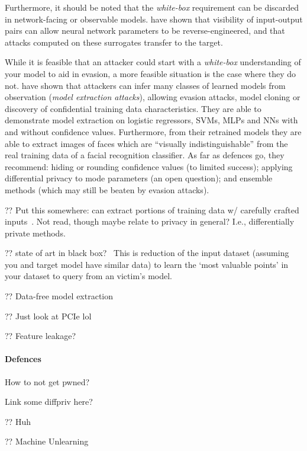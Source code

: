 Furthermore, it should be noted that the \emph{white-box} requirement can be discarded in network-facing or observable models.
\textcite{DBLP:conf/uss/TramerZJRR16,DBLP:conf/uss/JagielskiCBKP20} have shown that visibility of input-output pairs can allow neural network parameters to be reverse-engineered, and that attacks computed on these surrogates transfer to the target.

While it is feasible that an attacker could start with a \emph{white-box} understanding of your model to aid in evasion, a more feasible situation is the case where they do not.
\textcite{DBLP:conf/uss/TramerZJRR16} have shown that attackers can infer many classes of learned models from observation (\emph{model extraction attacks}), allowing evasion attacks, model cloning or discovery of confidential training data characteristics.
They are able to demonstrate model extraction on logistic regressors, SVMs, MLPs and NNs with and without confidence values.
Furthermore, from their retrained models they are able to extract images of faces which are ``visually indistinguishable'' from the real training data of a facial recognition classifier.
As far as defences go, they recommend: hiding or rounding confidence values (to limited success); applying differential privacy to mode parameters (an open question); and ensemble methods (which may still be beaten by evasion attacks).

?? Put this somewhere: can extract portions of training data w/ carefully crafted inputs~\parencite{DBLP:journals/corr/abs-2012-07805}. Not read, though maybe relate to privacy in general? I.e., differentially private methods.

?? state of art in black box?~\parencite{DBLP:conf/uss/HeM0HH21}
This is reduction of the input dataset (assuming you and target model have similar data) to learn the `most valuable points' in your dataset to query from an victim's model.

?? Data-free model extraction~\parencite{DBLP:conf/cvpr/TruongMWP21}

?? Just look at PCIe lol~\parencite{DBLP:conf/uss/ZhuCZL21}

?? Feature leakage?~\parencite{DBLP:conf/sp/MelisSCS19}

\paragraph{Defences}
How to not get pwned?

Link some diffpriv here?

?? Huh~\parencite{DBLP:journals/corr/abs-2103-07101}

?? Machine Unlearning~\parencite{DBLP:conf/sp/BourtouleCCJTZL21}
